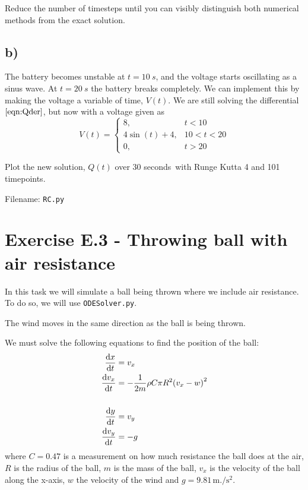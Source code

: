 \documentclass[10pt,a4paper]{article}
\begin{document}
Reduce the number of timesteps until you can visibly distinguish both numerical methods from the exact solution.


\subsection*{b)}
The battery becomes unstable at $t=\SI{10}{s}$, and the voltage starts oscillating as a sinus wave. At $t = \SI{20}{s}$ the battery breaks completely. We can implement this by making the voltage a variable of time, $V(t)$. We are still solving the differential $\ref{eqn:Qder}$, but now with a voltage given as
\begin{equation}
V(t) =
\begin{cases}
    8,           &t < 10 \\
    4\sin(t)+4,  &10 < t < 20 \\
    0,           &t > 20
\end{cases}
\end{equation}

Plot the new solution, $Q(t)$ over 30 seconds with Runge Kutta 4 and 101 timepoints. 

Filename: \texttt{RC.py}



\section*{Exercise E.3 - Throwing ball with air resistance}
In this task we will simulate a ball being thrown where we include air resistance. To do so, we will use \texttt{ODESolver.py}.

The wind moves in the same direction as the ball is being thrown. 

We must solve the following equations to find the position of the ball:
\begin{align*}
\dv{x}{t} &= v_x \\
\dv{v_x}{t} &= -\frac{1}{2m}\rho C \pi R^2 \qty(v_x - w)^2 \\
\hfill \\
\dv{y}{t} &= v_y \\
\dv{v_y}{t} &= -g
\end{align*}
where $C = 0.47$ is a measurement on how much resistance the ball does at the air, $R$ is the radius of the ball, $m$ is the mass of the ball, $v_x$ is the velocity of the ball along the x-axis, $w$ the velocity of the wind and $g = 9.81\,\si{\meter.\per\square\second}$.
\end{document}
